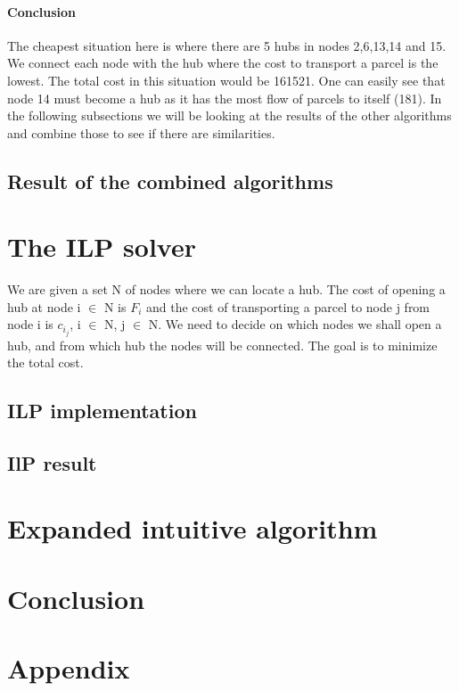 \documentclass{article}
\begin{document}
\paragraph{Conclusion}
The cheapest situation here is where there are 5 hubs in nodes 2,6,13,14 and 15. We connect each node with the hub where the cost to transport a parcel is the lowest. The total cost in this situation would be 161521. One can easily see that node 14 must become a hub as it has the most flow of parcels to itself (181). In the following subsections we will be looking at the results of the other algorithms and combine those to see if there are similarities.
    

    
    
    \subsection{Result of the combined algorithms}


 
\newpage  
\section{The ILP solver}
We are given a set N of nodes where we can locate a hub. The cost of opening a hub at node i $\in$ N is $F_i$ and the cost of transporting a parcel to node j from node i is $c_{i_j}$, i $\in$ N, j $\in$ N. We need to decide on which nodes we shall open a hub, and from which hub the nodes will be connected. The goal is to minimize the total cost. 
    \subsection{ILP implementation}
    \subsection{IlP result}

\newpage
\section{Expanded intuitive algorithm}


\newpage
\section{Conclusion}


\section{Appendix} 
\end{document}
